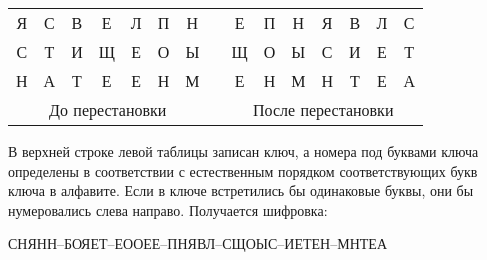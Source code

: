 \begin{table} [htbp]
{\begin{SingleSpace}
\begin{tabular}{ccccccccccccccc}
      \multicolumn{1}{|c|}{Я}          & \multicolumn{1}{c|}{С}          & \multicolumn{1}{c|}{В}          & \multicolumn{1}{c|}{Е}          & \multicolumn{1}{c|}{Л}          & \multicolumn{1}{c|}{П}          & \multicolumn{1}{c|}{Н}          & \multicolumn{1}{c|}{} & \multicolumn{1}{c|}{Е}          & \multicolumn{1}{c|}{П}          & \multicolumn{1}{c|}{Н}          & \multicolumn{1}{c|}{Я}          & \multicolumn{1}{c|}{В}          & \multicolumn{1}{c|}{Л}          & \multicolumn{1}{c|}{С}          \\ \cline{1-7} \cline{9-15}
      \multicolumn{1}{|c|}{С}          & \multicolumn{1}{c|}{Т}          & \multicolumn{1}{c|}{И}          & \multicolumn{1}{c|}{Щ}          & \multicolumn{1}{c|}{Е}          & \multicolumn{1}{c|}{О}          & \multicolumn{1}{c|}{Ы}          & \multicolumn{1}{c|}{} & \multicolumn{1}{c|}{Щ}          & \multicolumn{1}{c|}{О}          & \multicolumn{1}{c|}{Ы}          & \multicolumn{1}{c|}{С}          & \multicolumn{1}{c|}{И}          & \multicolumn{1}{c|}{Е}          & \multicolumn{1}{c|}{Т}          \\ \cline{1-7} \cline{9-15}
      \multicolumn{1}{|c|}{Н}          & \multicolumn{1}{c|}{А}          & \multicolumn{1}{c|}{Т}          & \multicolumn{1}{c|}{Е}          & \multicolumn{1}{c|}{Е}          & \multicolumn{1}{c|}{Н}          & \multicolumn{1}{c|}{М}          & \multicolumn{1}{c|}{} & \multicolumn{1}{c|}{Е}          & \multicolumn{1}{c|}{Н}          & \multicolumn{1}{c|}{М}          & \multicolumn{1}{c|}{Н}          & \multicolumn{1}{c|}{Т}          & \multicolumn{1}{c|}{Е}          & \multicolumn{1}{c|}{А}          \\ \cline{1-7} \cline{9-15}
      \multicolumn{7}{c}{До перестановки}                                                                                                                                                                                                          & \multicolumn{1}{l}{}  & \multicolumn{7}{c}{После перестановки}
      \end{tabular}
    \end{SingleSpace}
  }
\end{table}

В верхней строке левой таблицы записан ключ, а номера под буквами ключа
определены в соответствии с естественным порядком соответствующих букв ключа
в алфавите. Если в ключе встретились бы одинаковые буквы, они бы нумеровались
слева направо. Получается шифровка:%
\begin{center}
СНЯНН--БОЯЕТ--ЕООЕЕ--ПНЯВЛ--СЩОЫС--ИЕТЕН--МНТЕА
\end{center}

